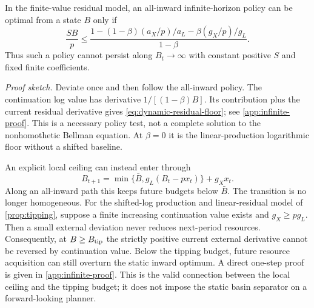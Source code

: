 \begin{corollary}
\label{cor:dynamic-residual}
In the finite-value residual model, an all-inward infinite-horizon policy
can be optimal from a state $B$ only if
\begin{equation}
 \frac{SB}{p}\leq
 \frac{1-(1-\beta)(a_X/p)/a_L-\beta(g_X/p)/g_L}{1-\beta}.
 \label{eq:dynamic-residual-floor}
\end{equation}
Thus such a policy cannot persist along $B_t\to\infty$ with constant
positive $S$ and fixed finite coefficients.
\end{corollary}
\noindent\emph{Proof sketch.}
Deviate once and then follow the all-inward policy. The continuation log
value has derivative $1/[(1-\beta)B]$. Its contribution plus the current
residual derivative gives \cref{eq:dynamic-residual-floor}; see
\cref{app:infinite-proof}. This is a necessary policy test, not a complete
solution to the nonhomothetic Bellman equation. At $\beta=0$ it is the
linear-production logarithmic floor without a shifted baseline.

An explicit local ceiling can instead enter through
\begin{equation}
 B_{t+1}=\min\{\bar B,g_L(B_t-px_t)\}+g_Xx_t.
 \label{eq:capped-transition}
\end{equation}
Along an all-inward path this keeps future budgets below $\bar B$.
The transition is no longer homogeneous. For the shifted-log production
and linear-residual model of \cref{prop:tipping}, suppose a finite
increasing continuation value exists and $g_X\geq pg_L$. Then a small
external deviation never reduces next-period resources. Consequently,
at $B\geq B_{\rm tip}$ the strictly positive current external derivative
cannot be reversed by continuation value. Below the tipping budget,
future resource acquisition can still overturn the static inward optimum.
A direct one-step proof is given in \cref{app:infinite-proof}.
This is the valid connection between the local ceiling and the tipping
budget; it does not impose the static basin separator on a forward-looking
planner.
